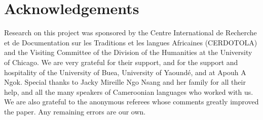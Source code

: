 \documentclass[output=paper
,newtxmath
,modfonts
,nonflat]{langsci/langscibook}
\begin{document}
\section*{Acknowledgements}

Research on this project was sponsored by the Centre International de Recherche et de Documentation sur les Traditions et les langues Africaines (CERDOTOLA) and the Visiting Committee of the Division of the Humanities at the University of Chicago. We are very grateful for their support, and for the support and hospitality of the University of Buea, University of Yaound\'{e}, and at Apouh A Ngok. Special thanks to Jacky Mireille Ngo Nsang and her family for all their help, and all the many speakers of Cameroonian languages who worked with us. We are also grateful to the anonymous referees whose comments greatly improved the paper. Any remaining errors are our own.

\sloppy
\printbibliography[heading=subbibliography,notkeyword=this]
\end{document}
